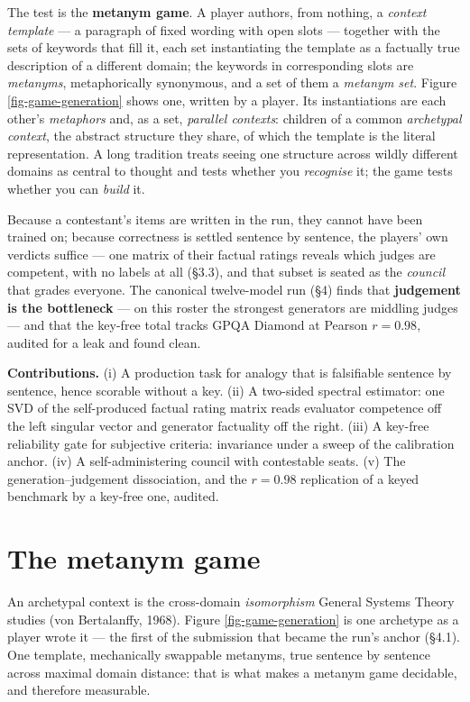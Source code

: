 \documentclass{article}
\begin{document}
The test is the \textbf{metanym game}. A player authors, from nothing, a \emph{context template} --- a paragraph of fixed wording with open slots --- together with the sets of keywords that fill it, each set instantiating the template as a factually true description of a different domain; the keywords in corresponding slots are \emph{metanyms}, metaphorically synonymous, and a set of them a \emph{metanym set}. Figure \ref{fig-game-generation} shows one, written by a player. Its instantiations are each other's \emph{metaphors} and, as a set, \emph{parallel contexts}: children of a common \emph{archetypal context}, the abstract structure they share, of which the template is the literal representation. A long tradition treats seeing one structure across wildly different domains as central to thought and tests whether you \emph{recognise} it; the game tests whether you can \emph{build} it.

Because a contestant's items are written in the run, they cannot have been trained on; because correctness is settled sentence by sentence, the players' own verdicts suffice --- one matrix of their factual ratings reveals which judges are competent, with no labels at all (\S{}3.3), and that subset is seated as the \emph{council} that grades everyone. The canonical twelve-model run (\S{}4) finds that \textbf{judgement is the bottleneck} --- on this roster the strongest generators are middling judges --- and that the key-free total tracks GPQA Diamond at Pearson \(r = 0.98\), audited for a leak and found clean.

\textbf{Contributions.} (i) A production task for analogy that is falsifiable sentence by sentence, hence scorable without a key. (ii) A two-sided spectral estimator: one SVD of the self-produced factual rating matrix reads evaluator competence off the left singular vector and generator factuality off the right. (iii) A key-free reliability gate for subjective criteria: invariance under a sweep of the calibration anchor. (iv) A self-administering council with contestable seats. (v) The generation--judgement dissociation, and the \(r = 0.98\) replication of a keyed benchmark by a key-free one, audited.

\section{The metanym game}\label{the-metanym-game}

An archetypal context is the cross-domain \emph{isomorphism} General Systems Theory studies (von Bertalanffy, 1968). Figure \ref{fig-game-generation} is one archetype as a player wrote it --- the first of the submission that became the run's anchor (\S{}4.1). One template, mechanically swappable metanyms, true sentence by sentence across maximal domain distance: that is what makes a metanym game decidable, and therefore measurable.
\end{document}

